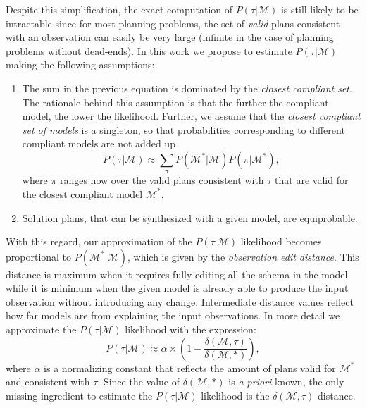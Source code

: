 \documentclass[letterpaper]{article} %
\begin{document}
Despite this simplification, the exact computation of $P(\tau|\mathcal{M})$ is still likely to be intractable since for most planning problems, the set of {\em valid} plans consistent with an observation can easily be very large (infinite in the case of planning problems without dead-ends). In this work we propose to estimate $P(\tau|\mathcal{M})$ making the following assumptions:
\begin{enumerate}
\item The sum in the previous equation is dominated by the {\em closest compliant set}. The rationale behind this assumption is that the further the compliant model, the lower the likelihood. Further, we assume that the {\em closest compliant set of models} is a singleton, so that probabilities corresponding to different compliant models are not added up 
\[
P(\tau|\mathcal{M}) \approx \sum_{\pi} P(\mathcal{M^*}|\mathcal{M})P(\pi|\mathcal{M^*}),
\]
where $\pi$ ranges now over the valid plans consistent with $\tau$ that are valid for the closest compliant model $\mathcal{M^*}$.

\item Solution plans, that can be synthesized with a given model, are equiprobable.  
\end{enumerate}

With this regard, our approximation of the $P(\tau|\mathcal{M})$ likelihood becomes proportional to $P(\mathcal{M^*}|\mathcal{M})$, which is given by the {\em observation edit distance}. This distance is maximum when it requires fully editing all the schema in the model while it is minimum when the given model is already able to produce the input observation without introducing any change. Intermediate distance values reflect how far models are from explaining the input observations. In more detail we approximate the $P(\tau|\mathcal{M})$ likelihood with the expression:
\[
P(\tau|\mathcal{M}) \approx \alpha\times (1-\frac{\delta(\mathcal{M},\tau)}{\delta(\mathcal{M},*)}),
\]
where $\alpha$ is a normalizing constant that reflects the amount of plans valid for $\mathcal{M^*}$ and consistent with $\tau$. Since the value of $\delta(\mathcal{M},*)$ is {\em a priori} known, the only missing ingredient to estimate the $P(\tau|\mathcal{M})$ likelihood is the $\delta(\mathcal{M},\tau)$ distance.
\end{document}
